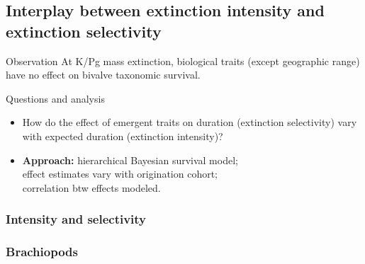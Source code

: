 \documentclass{beamer}
\begin{document}
\subsection{Interplay between extinction intensity and extinction selectivity}

\begin{frame}
  \begin{alertblock}{Observation}
    At K/Pg mass extinction, biological traits (except geographic range) have no effect on \alert{bivalve} taxonomic survival.

  \end{alertblock}
\end{frame}

\begin{frame}
  \begin{alertblock}{Questions and analysis}
    \begin{itemize}
      \item How do the effect of emergent traits on duration (\alert{extinction selectivity}) vary with expected duration (\alert{extinction intensity})?
      \item \textbf{Approach:} hierarchical Bayesian survival model; \\effect estimates vary with origination cohort; \\correlation btw effects modeled.
    \end{itemize}
  \end{alertblock}
\end{frame}

\begin{frame}
  \frametitle{Intensity and selectivity}
  \begin{center}
  \end{center}
\end{frame}

\begin{frame}
  \frametitle{Brachiopods}

  \footnotesize{}
\end{frame}
\end{document}
